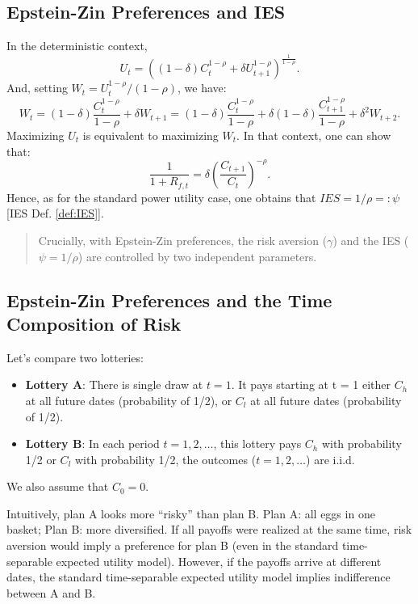 \documentclass[
  12pt,
]{book}
\providecommand{\tightlist}{%
  \setlength{\itemsep}{0pt}\setlength{\parskip}{0pt}}
\theoremstyle{definition}
\theoremstyle{definition}
\theoremstyle{definition}
\theoremstyle{definition}
\theoremstyle{remark}
\begin{document}
\hypertarget{epstein-zin-preferences-and-ies}{%
\subsection{Epstein-Zin Preferences and IES}\label{epstein-zin-preferences-and-ies}}

In the deterministic context,
\[
U_t = \left((1-\delta)C_t^{1-\rho} + \delta U_{t+1}^{1-\rho}\right)^{\frac{1}{1-\rho}}.
\]
And, setting \(W_t = U_t^{1-\rho}/(1-\rho)\), we have:
\[
W_t = (1-\delta)\frac{C_t^{1-\rho}}{1-\rho} + \delta W_{t+1} = (1-\delta)\frac{C_t^{1-\rho}}{1-\rho} + \delta(1-\delta)\frac{C_{t+1}^{1-\rho}}{1-\rho} + \delta^2 W_{t+2}.
\]
Maximizing \(U_t\) is equivalent to maximizing \(W_t\). In that context, one can show that:
\[
\frac{1}{1+ R_{f,t}}=\delta \left(\frac{C_{t+1}}{C_t}\right)^{-\rho}.
\]
Hence, as for the standard power utility case, one obtains that \(IES = 1/\rho =: \psi\) {[}IES Def. \ref{def:IES}{]}.

\begin{quote}
Crucially, with Epstein-Zin preferences, the risk aversion (\(\gamma\)) and the IES (\(\psi=1/\rho\)) are controlled by two independent parameters.
\end{quote}

\hypertarget{epstein-zin-preferences-and-the-time-composition-of-risk}{%
\subsection{Epstein-Zin Preferences and the Time Composition of Risk}\label{epstein-zin-preferences-and-the-time-composition-of-risk}}

Let's compare two lotteries:

\begin{itemize}
\tightlist
\item
  \textbf{Lottery A}: There is single draw at \(t=1\). It pays starting at t = 1 either \(C_h\) at all future dates (probability of 1/2), or \(C_l\) at all future dates (probability of 1/2).
\item
  \textbf{Lottery B}: In each period \(t = 1, 2, \dots\), this lottery pays \(C_h\) with probability 1/2 or \(C_l\) with probability 1/2, the outcomes (\(t = 1, 2, \dots\)) are i.i.d.
\end{itemize}

We also assume that \(C_0=0\).

Intuitively, plan A looks more ``risky'' than plan B.
Plan A: all eggs in one basket; Plan B: more diversified.
If all payoffs were realized at the same time, risk aversion would imply a preference for plan B (even in the standard time-separable expected utility model).
However, if the payoffs arrive at different dates, the standard time-separable expected utility model implies indifference between A and B.
\end{document}
